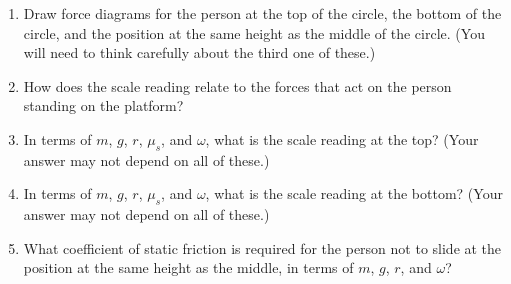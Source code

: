 \documentclass[12pt]{article}
\begin{document}
\begin{enumerate}
\begin{enumerate}
\item Draw force diagrams for the person at the top of the circle, the bottom of the circle, and the position at the 
same height as the middle of the circle. (You will need to think carefully about the third one of these.)
\item How does the scale reading relate to the forces that act on the person standing on the platform?
\item In terms of $m$, $g$, $r$, $\mu_s$, and $\omega$, what is the scale reading at the top? (Your answer may not depend on all of these.)
\item In terms of $m$, $g$, $r$, $\mu_s$, and $\omega$, what is the scale reading at the bottom? (Your answer may not depend on all of these.)
\item What coefficient of static friction is required for the person not to slide at the position at the same height as the middle, in terms of $m$, $g$, $r$, and $\omega$?
\end{enumerate}


\end{enumerate}
\end{document}
